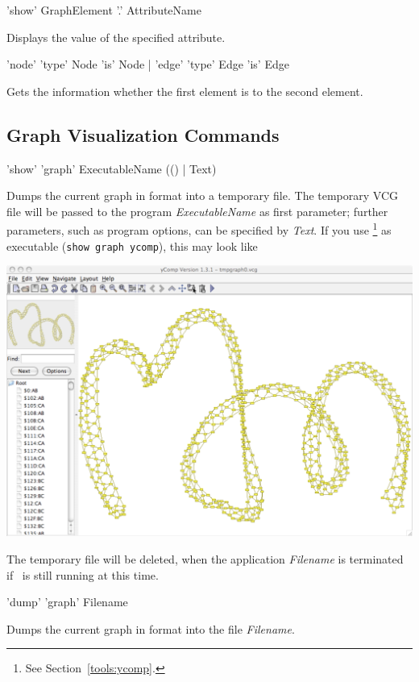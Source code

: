 \begin{rail}
  'show' GraphElement '.' AttributeName
\end{rail}
Displays the value of the specified attribute.

\begin{rail}
  'node' 'type' Node 'is' Node | 'edge' 'type' Edge 'is' Edge
\end{rail}
Gets the information whether the first element is  to the second element.


\subsection{Graph Visualization Commands}

\begin{rail}
  'show' 'graph' ExecutableName (() | Text)
\end{rail}
Dumps the current graph in  format into a temporary file.
The temporary VCG file will be passed to the program \emph{ExecutableName} as first parameter;
further parameters, such as program options, can be specified by \emph{Text}.
If you use \yComp\footnote{See Section~\ref{tools:ycomp}.} as executable (\texttt{show graph ycomp}), this may look like
\begin{center}
  \includegraphics[width=0.75\linewidth]{fig/showgraph}
\end{center}  
The temporary file will be deleted, when the application \emph{Filename} is terminated if \GrShell\ is still running at this time.

\begin{rail}
  'dump' 'graph' Filename
\end{rail}
Dumps the current graph in  format into the file \emph{Filename}.\\

